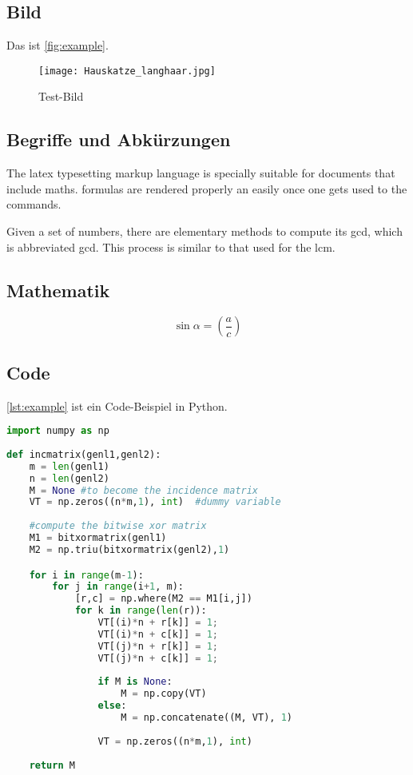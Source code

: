 \subsection{Bild}

Das ist \autoref{fig:example}.

\begin{figure}[tbh]
 \centering
 \texttt{[image: Hauskatze\_langhaar.jpg]}
 \caption{Test-Bild}
 \label{fig:example}
\end{figure}

\subsection{Begriffe und Abkürzungen}
The \Gls{latex} typesetting markup language is specially suitable for documents that include \gls{maths}. \Glspl{formula} are rendered properly an easily once one gets used to the commands.

Given a set of numbers, there are elementary methods to compute its \acrlong{gcd}, which is abbreviated \acrshort{gcd}. This process is similar to that used for the \acrfull{lcm}.

\subsection{Mathematik}

\begin{equation}
 \sin \alpha = \left( \frac{a}{c} \right)
\end{equation}

\subsection{Code}

\autoref{lst:example} ist ein Code-Beispiel in Python.

\begin{lstlisting}[language=Python, caption=Code-Beispiel mit Python, label={lst:example}]
import numpy as np
    
def incmatrix(genl1,genl2):
    m = len(genl1)
    n = len(genl2)
    M = None #to become the incidence matrix
    VT = np.zeros((n*m,1), int)  #dummy variable
    
    #compute the bitwise xor matrix
    M1 = bitxormatrix(genl1)
    M2 = np.triu(bitxormatrix(genl2),1) 

    for i in range(m-1):
        for j in range(i+1, m):
            [r,c] = np.where(M2 == M1[i,j])
            for k in range(len(r)):
                VT[(i)*n + r[k]] = 1;
                VT[(i)*n + c[k]] = 1;
                VT[(j)*n + r[k]] = 1;
                VT[(j)*n + c[k]] = 1;
                
                if M is None:
                    M = np.copy(VT)
                else:
                    M = np.concatenate((M, VT), 1)
                
                VT = np.zeros((n*m,1), int)
    
    return M
\end{lstlisting}
